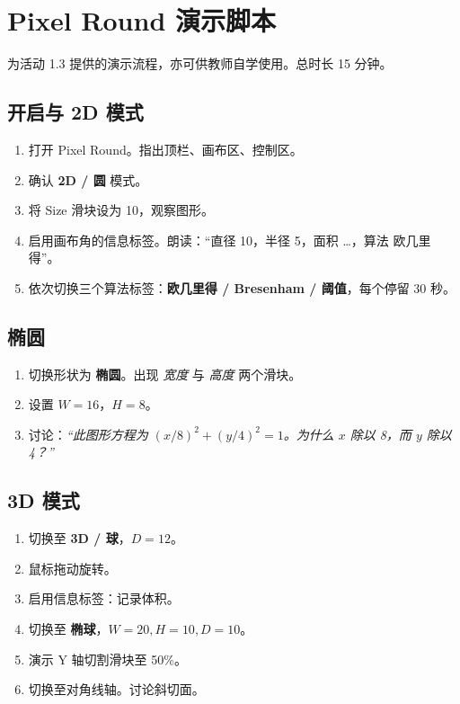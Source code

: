 \documentclass[12pt,a4paper]{scrartcl}
\newcommand{\acc}[1]{\textcolor{accent}{\textbf{#1}}}
\begin{document}
\newpage
\appendix
\renewcommand{\thesection}{\Alph{section}}
\setcounter{section}{0}

\section{Pixel Round 演示脚本}\label{ap:yanshi}

为活动 1.3 提供的演示流程，亦可供教师自学使用。总时长 15 分钟。

\subsection{开启与 2D 模式}
\begin{enumerate}[leftmargin=1.5em,itemsep=0.15em,topsep=0.3em]
  \item 打开 Pixel Round。指出顶栏、画布区、控制区。
  \item 确认 \acc{2D / 圆} 模式。
  \item 将 Size 滑块设为 10，观察图形。
  \item 启用画布角的信息标签。朗读：“直径 10，半径 5，面积 …，算法 欧几里得”。
  \item 依次切换三个算法标签：\acc{欧几里得 / Bresenham / 阈值}，每个停留 30 秒。
\end{enumerate}

\subsection{椭圆}
\begin{enumerate}[leftmargin=1.5em,itemsep=0.15em,topsep=0.3em]
  \item 切换形状为 \acc{椭圆}。出现 \emph{宽度} 与 \emph{高度} 两个滑块。
  \item 设置 $W = 16$，$H = 8$。
  \item 讨论：\emph{“此图形方程为 $(x/8)^2 + (y/4)^2 = 1$。为什么 $x$ 除以 8，而 $y$ 除以 4？”}
\end{enumerate}

\subsection{3D 模式}
\begin{enumerate}[leftmargin=1.5em,itemsep=0.15em,topsep=0.3em]
  \item 切换至 \acc{3D / 球}，$D = 12$。
  \item 鼠标拖动旋转。
  \item 启用信息标签：记录体积。
  \item 切换至 \acc{椭球}，$W = 20, H = 10, D = 10$。
  \item 演示 Y 轴切割滑块至 50\%。
  \item 切换至对角线轴。讨论斜切面。
\end{enumerate}
\end{document}
